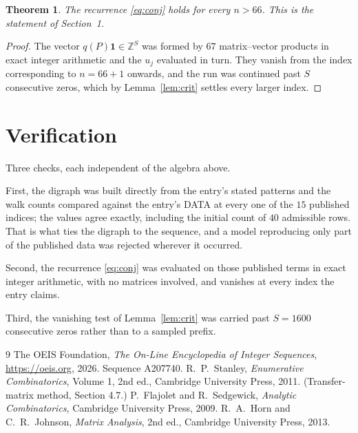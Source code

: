 \documentclass[11pt,a4paper]{article}
\theoremstyle{plain}
\newtheorem{theorem}{Theorem}
\theoremstyle{definition}
\begin{document}
\begin{theorem}
The recurrence \eqref{eq:conj} holds for every $n>66$. This is the statement of
Section~1.
\end{theorem}

\begin{proof}
The vector $q(P)\mathbf{1}\in\mathbb{Z}^{S}$ was formed by $67$ matrix--vector
products in exact integer arithmetic and the $u_j$ evaluated in turn. They vanish from the
index corresponding to $n=66+1$ onwards, and the run was continued past $S$ consecutive
zeros, which by Lemma~\ref{lem:crit} settles every larger index.
\end{proof}

\section{Verification}

Three checks, each independent of the algebra above.

First, the digraph was built directly from the entry's stated patterns and the walk counts
compared against the entry's DATA at every one of the $15$ published indices; the
values agree exactly, including the initial count of $40$ admissible rows. That is
what ties the digraph to the sequence, and a model reproducing only part of the published
data was rejected wherever it occurred.

Second, the recurrence \eqref{eq:conj} was evaluated on those published terms in exact
integer arithmetic, with no matrices involved, and vanishes at every index the entry claims.

Third, the vanishing test of Lemma~\ref{lem:crit} was carried past $S=1600$ consecutive
zeros rather than to a sampled prefix.

\begin{thebibliography}{9}
 The OEIS Foundation, \emph{The On-Line Encyclopedia of Integer
Sequences}, \url{https://oeis.org}, 2026. Sequence A207740.
 R.~P.~Stanley, \emph{Enumerative Combinatorics}, Volume 1, 2nd ed.,
Cambridge University Press, 2011. (Transfer-matrix method, Section 4.7.)
 P.~Flajolet and R.~Sedgewick, \emph{Analytic Combinatorics}, Cambridge
University Press, 2009.
 R.~A.~Horn and C.~R.~Johnson, \emph{Matrix Analysis}, 2nd ed., Cambridge
University Press, 2013.
\end{thebibliography}
\end{document}
